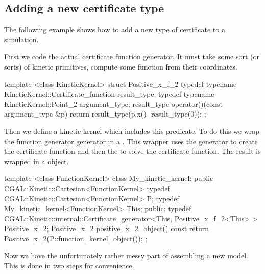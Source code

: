 \subsection{Adding a new certificate type\label{sec:kds_add_cert}}


The following example shows how to add a new type of certificate to a simulation. 

First we code the actual certificate function generator. It must take
some sort (or sorts) of kinetic primitives, compute some function from
their coordinates.

\begin{ccExampleCode}
template <class KineticKernel>
struct Positive_x_f_2 {
  typedef typename KineticKernel::Certificate_function result_type;
  typedef typename KineticKernel::Point_2 argument_type;
  result_type operator()(const argument_type &p){
    return result_type(p.x()- result_type(0));
  }
};
\end{ccExampleCode}

Then we define a kinetic kernel which includes this predicate. To do
this we wrap the function generator generator in a
.
This wrapper uses the generator to create the certificate function and
then the  to solve the certificate
function. The result is wrapped in a 
object.

\begin{ccExampleCode}
template <class FunctionKernel> 
class My_kinetic_kernel:
  public CGAL::Kinetic::Cartesian<FunctionKernel> {
  typedef CGAL::Kinetic::Cartesian<FunctionKernel> P;
  typedef My_kinetic_kernel<FunctionKernel> This;
public:
  typedef CGAL::Kinetic::internal::Certificate_generator<This, Positive_x_f_2<This> > Positive_x_2;
  Positive_x_2 positive_x_2_object() const
  {
    return Positive_x_2(P::function_kernel_object());
  }
};
\end{ccExampleCode}

Now we have the unfortunately rather messy part of assembling a new
 model. This is done in two steps for convenience.


